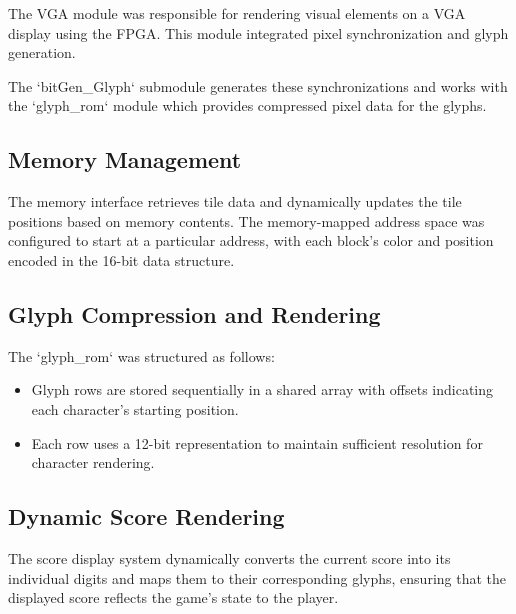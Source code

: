 \documentclass{subfile}
\begin{document}

  The VGA module was responsible for rendering visual elements on a VGA display using the FPGA. This module integrated pixel synchronization and glyph generation.

  The `bitGen\_Glyph` submodule generates these synchronizations and works with the `glyph\_rom` module which provides compressed pixel data for the glyphs.

  \subsection{Memory Management}
  The memory interface retrieves tile data and dynamically updates the tile positions based on memory contents. The memory-mapped address space was configured to start at a particular address, with each block's color and position encoded in the 16-bit data structure. 

  \subsection{Glyph Compression and Rendering}
  The `glyph\_rom` was structured as follows:
  \begin{itemize}
      \item Glyph rows are stored sequentially in a shared array with offsets indicating each character's starting position.
      \item Each row uses a 12-bit representation to maintain sufficient resolution for character rendering.
  \end{itemize}

  \subsection{Dynamic Score Rendering}
  The score display system dynamically converts the current score into its individual digits and maps them to their corresponding glyphs, ensuring that the displayed score reflects the game's state to the player. 

\end{document}
